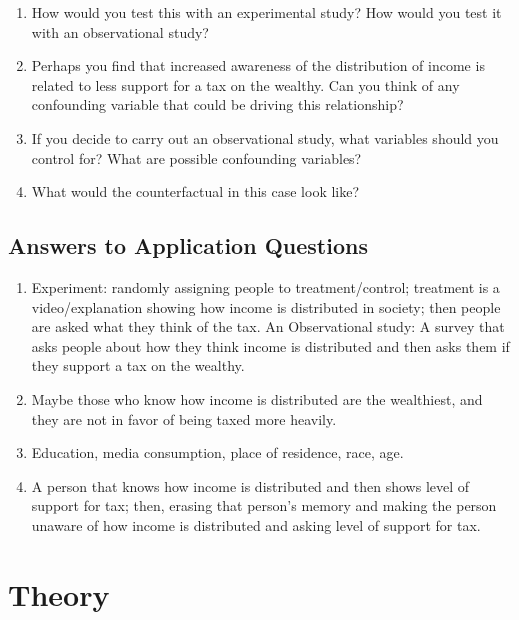 \documentclass{book}
\begin{document}
\begin{enumerate}
\def\labelenumi{\arabic{enumi}.}
\item
  How would you test this with an experimental study? How would you test it
  with an observational study?
\item
  Perhaps you find that increased awareness of the distribution of income is
  related to less support for a tax on the wealthy. Can you think of any
  confounding variable that could be driving this relationship?
\item
  If you decide to carry out an observational study, what variables should you
  control for? What are possible confounding variables?
\item
  What would the counterfactual in this case look like?
\end{enumerate}

\hypertarget{answers-to-application-questions}{%
\section{Answers to Application
Questions}\label{answers-to-application-questions}}

\begin{enumerate}
\def\labelenumi{\arabic{enumi}.}
\item
  Experiment: randomly assigning people to treatment/control; treatment is a
  video/explanation showing how income is distributed in society; then people
  are asked what they think of the tax. An Observational study: A survey that
  asks people about how they think income is distributed and then asks them if
  they support a tax on the wealthy.
\item
  Maybe those who know how income is distributed are the wealthiest, and they
  are not in favor of being taxed more heavily.
\item
  Education, media consumption, place of residence, race, age.
\item
  A person that knows how income is distributed and then shows level of
  support for tax; then, erasing that person's memory and making the person
  unaware of how income is distributed and asking level of support for tax.
\end{enumerate}

\hypertarget{theory}{%
\chapter{Theory}\label{theory}}
\end{document}
